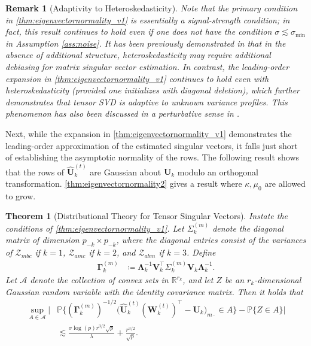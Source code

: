 \documentclass[10pt]{article}
\newcommand{\0}{{\mathbf{0}}}
\newcommand{\1}{{\mathbf{1}}}
\newcommand{\U}{{\mathbf{U}}}
\renewcommand{\citet}{\cite}
\renewcommand{\t}{^{\top}}
\newcommand{\uhat}{\mathbf{\hat{U}}}
\newtheorem{theorem}{Theorem}
\newtheorem{remark}{Remark}
\newcommand{\inv}{^{-1}}
\renewcommand{\hat}{\widehat}
\renewcommand{\hat}{\widehat}
\begin{document}
 


 
 
 \begin{remark}[Adaptivity to Heteroskedasticity]
 Note that the primary condition in \cref{thm:eigenvectornormality_v1} is essentially a signal-strength condition;  in fact, this result continues to hold even if one does not have the condition $\sigma \lesssim \sigma_{\min}$ in Assumption \ref{ass:noise}.  It has been previously demonstrated in \citet{zhang_heteroskedastic_2022} that in the absence of additional structure, heteroskedasticity may require additional debiasing for matrix singular vector estimation.  In contrast, the leading-order expansion in \cref{thm:eigenvectornormality_v1} continues to hold \emph{even with heteroskedasticity} (provided one initializes with diagonal deletion), which further demonstrates that tensor SVD is \emph{adaptive} to unknown variance profiles.  This phenomenon has also been discussed in a perturbative sense in \citet{agterberg_estimating_2022}.  
 \end{remark}
 
  


 Next, while the expansion in \cref{thm:eigenvectornormality_v1} demonstrates the leading-order approximation of the estimated singular vectors, it falls just short of establishing the asymptotic normality of the rows.  The following result shows that the rows of $\uhat_k^{(t)}$ are Gaussian about $\U_k$ modulo an orthogonal transformation.  \cref{thm:eigenvectornormality2} gives a result where $\kappa,\mu_0$ are allowed to grow.    
 
 
 \begin{theorem}[Distributional Theory for Tensor Singular Vectors] \label{thm:eigenvectornormality2_v1}
 Instate the conditions of \cref{thm:eigenvectornormality_v1}.  
 Let $\Sigma^{(m)}_k$ denote the diagonal matrix of dimension $p_{-k} \times p_{-k}$, where the diagonal entries consist of the variances of $\mathcal{Z}_{mbc}$ if $k = 1$, $\mathcal{Z}_{amc}$ if $k = 2$, and $\mathcal{Z}_{abm}$ if $k =3$.  Define
 \begin{align*}
     \mathbf{\Gamma}^{(m)}_k &\coloneqq \mathbf{\Lambda}_k\inv \mathbf{V}_k\t \Sigma^{(m)}_k \mathbf{V}_k \mathbf{\Lambda}_k\inv.
 \end{align*}
  Let $\mathcal{A}$ denote the collection of convex sets in $\mathbb{R}^{r_k}$, and let $Z$ be an $r_k$-dimensional Gaussian random variable with the identity covariance matrix.  
   Then it holds that
 \begin{align*}
     \sup_{A \in \mathcal{A}} \bigg| &\mathbb{P}\bigg\{ (\mathbf{\Gamma}^{(m)}_k)^{-1/2} \bigg( \uhat_k^{(t)}(\mathbf{W}_k^{(t)})\t - \U_k \bigg)_{m\cdot} \in A \bigg\} - \mathbb{P}\{ Z \in A \} \bigg| \\
     &\lesssim  \frac{\sigma \log(p) r^{3/2} \sqrt{p}}{\lambda} + \frac{r^{3/2}}{\sqrt{p}}.
 \end{align*}
 \end{theorem}
 
\end{document}
